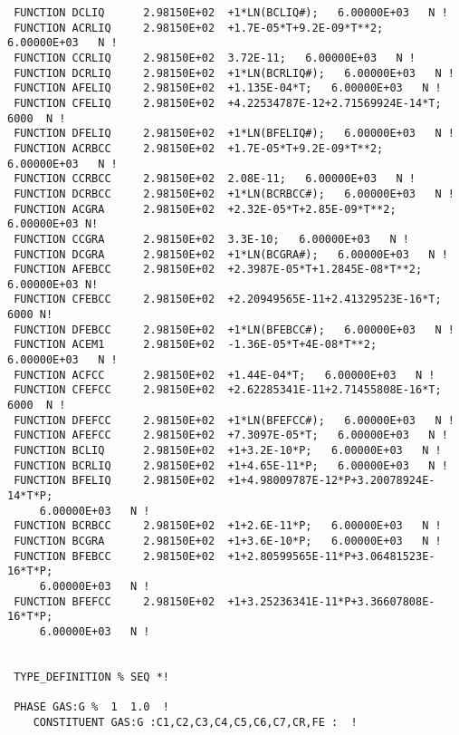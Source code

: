 \documentclass[12pt]{article}
\begin{document}
\begin{verbatim}
 FUNCTION DCLIQ      2.98150E+02  +1*LN(BCLIQ#);   6.00000E+03   N !
 FUNCTION ACRLIQ     2.98150E+02  +1.7E-05*T+9.2E-09*T**2;   6.00000E+03   N !
 FUNCTION CCRLIQ     2.98150E+02  3.72E-11;   6.00000E+03   N !
 FUNCTION DCRLIQ     2.98150E+02  +1*LN(BCRLIQ#);   6.00000E+03   N !
 FUNCTION AFELIQ     2.98150E+02  +1.135E-04*T;   6.00000E+03   N !
 FUNCTION CFELIQ     2.98150E+02  +4.22534787E-12+2.71569924E-14*T; 6000  N !
 FUNCTION DFELIQ     2.98150E+02  +1*LN(BFELIQ#);   6.00000E+03   N !
 FUNCTION ACRBCC     2.98150E+02  +1.7E-05*T+9.2E-09*T**2;   6.00000E+03   N !
 FUNCTION CCRBCC     2.98150E+02  2.08E-11;   6.00000E+03   N !
 FUNCTION DCRBCC     2.98150E+02  +1*LN(BCRBCC#);   6.00000E+03   N !
 FUNCTION ACGRA      2.98150E+02  +2.32E-05*T+2.85E-09*T**2;   6.00000E+03 N!
 FUNCTION CCGRA      2.98150E+02  3.3E-10;   6.00000E+03   N !
 FUNCTION DCGRA      2.98150E+02  +1*LN(BCGRA#);   6.00000E+03   N !
 FUNCTION AFEBCC     2.98150E+02  +2.3987E-05*T+1.2845E-08*T**2; 6.00000E+03 N!
 FUNCTION CFEBCC     2.98150E+02  +2.20949565E-11+2.41329523E-16*T; 6000 N!
 FUNCTION DFEBCC     2.98150E+02  +1*LN(BFEBCC#);   6.00000E+03   N !
 FUNCTION ACEM1      2.98150E+02  -1.36E-05*T+4E-08*T**2;   6.00000E+03   N !
 FUNCTION ACFCC      2.98150E+02  +1.44E-04*T;   6.00000E+03   N !
 FUNCTION CFEFCC     2.98150E+02  +2.62285341E-11+2.71455808E-16*T; 6000  N !
 FUNCTION DFEFCC     2.98150E+02  +1*LN(BFEFCC#);   6.00000E+03   N !
 FUNCTION AFEFCC     2.98150E+02  +7.3097E-05*T;   6.00000E+03   N !
 FUNCTION BCLIQ      2.98150E+02  +1+3.2E-10*P;   6.00000E+03   N !
 FUNCTION BCRLIQ     2.98150E+02  +1+4.65E-11*P;   6.00000E+03   N !
 FUNCTION BFELIQ     2.98150E+02  +1+4.98009787E-12*P+3.20078924E-14*T*P;   
     6.00000E+03   N !
 FUNCTION BCRBCC     2.98150E+02  +1+2.6E-11*P;   6.00000E+03   N !
 FUNCTION BCGRA      2.98150E+02  +1+3.6E-10*P;   6.00000E+03   N !
 FUNCTION BFEBCC     2.98150E+02  +1+2.80599565E-11*P+3.06481523E-16*T*P;   
     6.00000E+03   N !
 FUNCTION BFEFCC     2.98150E+02  +1+3.25236341E-11*P+3.36607808E-16*T*P;   
     6.00000E+03   N !


 TYPE_DEFINITION % SEQ *!

 PHASE GAS:G %  1  1.0  !
    CONSTITUENT GAS:G :C1,C2,C3,C4,C5,C6,C7,CR,FE :  !


\end{verbatim}
\end{document}
